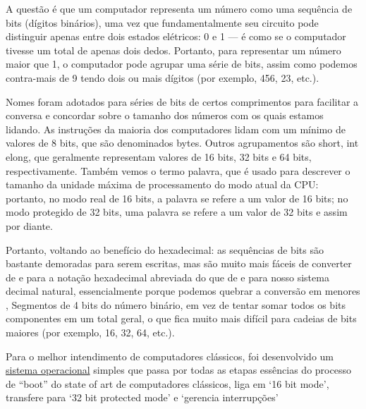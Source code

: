 A questão é que um computador representa um número como uma sequência de bits (dígitos binários), uma vez que fundamentalmente seu circuito pode distinguir apenas entre dois estados elétricos: 0 e 1 --- é como se o computador tivesse um total de apenas dois dedos. Portanto, para representar um número maior que 1, o computador pode agrupar uma série de bits, assim como podemos contra-mais de 9 tendo dois ou mais dígitos (por exemplo, 456, 23, etc.).

Nomes foram adotados para séries de bits de certos comprimentos para facilitar a conversa e concordar sobre o tamanho dos números com os quais estamos lidando. As instruções da maioria dos computadores lidam com um mínimo de valores de 8 bits, que são denominados bytes. Outros agrupamentos são short, int elong, que geralmente representam valores de 16 bits, 32 bits e 64 bits, respectivamente. Também vemos o termo palavra, que é usado para descrever o tamanho da unidade máxima de processamento do modo atual da CPU: portanto, no modo real de 16 bits, a palavra se refere a um valor de 16 bits; no modo protegido de 32 bits, uma palavra se refere a um valor de 32 bits e assim por diante.

Portanto, voltando ao benefício do hexadecimal: as sequências de bits são bastante demoradas para serem escritas, mas são muito mais fáceis de converter de e para a notação hexadecimal abreviada do que de e para nosso sistema decimal natural, essencialmente porque podemos quebrar a conversão em menores , Segmentos de 4 bits do número binário, em vez de tentar somar todos os bits componentes em um total geral, o que fica muito mais difícil para cadeias de bits maiores (por exemplo, 16, 32, 64, etc.).



Para o melhor intendimento de computadores clássicos, foi desenvolvido um \href{https://github.com/gzsig/zsig-OS}{sistema operacional} simples que passa por todas as etapas essências do processo de ``boot'' do state of art de computadores clássicos, liga em `16 bit mode', transfere para `32 bit protected mode' e `gerencia interrupções'
\newpage
